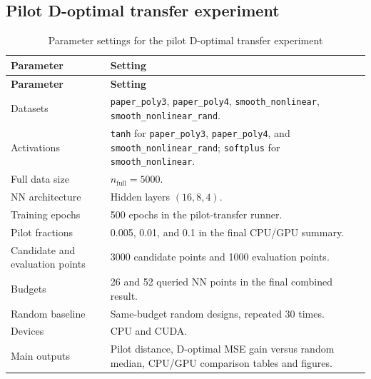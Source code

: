 \documentclass[UTF8,a4paper,11pt]{ctexart}
\begin{document}
\subsection{Pilot D-optimal transfer experiment}

\begin{longtable}{L{0.30\textwidth}L{0.58\textwidth}}
\caption{Parameter settings for the pilot D-optimal transfer experiment}
\label{tab:pilot-dopt-parameters} \\
\toprule
\textbf{Parameter} & \textbf{Setting} \\
\midrule
\endfirsthead
\toprule
\textbf{Parameter} & \textbf{Setting} \\
\midrule
\endhead
\bottomrule
\endlastfoot

Datasets
& \texttt{paper\_poly3}, \texttt{paper\_poly4}, \texttt{smooth\_nonlinear}, \texttt{smooth\_nonlinear\_rand}. \\

Activations
& \texttt{tanh} for \texttt{paper\_poly3}, \texttt{paper\_poly4}, and \texttt{smooth\_nonlinear\_rand}; \texttt{softplus} for \texttt{smooth\_nonlinear}. \\

Full data size
& $n_{\mathrm{full}}=5000$. \\

NN architecture
& Hidden layers $(16,8,4)$. \\

Training epochs
& 500 epochs in the pilot-transfer runner. \\

Pilot fractions
& 0.005, 0.01, and 0.1 in the final CPU/GPU summary. \\

Candidate and evaluation points
& 3000 candidate points and 1000 evaluation points. \\

Budgets
& 26 and 52 queried NN points in the final combined result. \\

Random baseline
& Same-budget random designs, repeated 30 times. \\

Devices
& CPU and CUDA. \\

Main outputs
& Pilot distance, D-optimal MSE gain versus random median, CPU/GPU comparison tables and figures. \\

\end{longtable}
\end{document}
